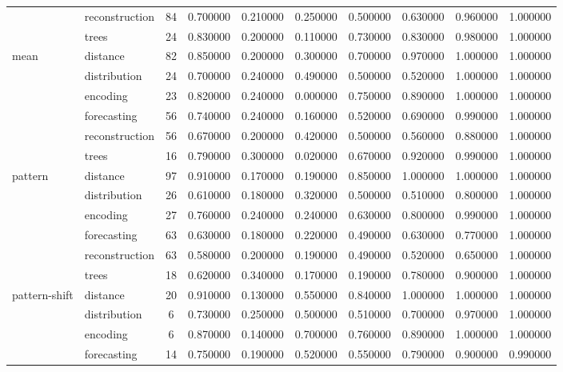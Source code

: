 \begin{tabular}{|l|l|c|c|c|c|c|c|c|c|}
 & reconstruction & 84 & 0.700000 & 0.210000 & 0.250000 & 0.500000 & 0.630000 & 0.960000 & 1.000000 \\
 & trees & 24 & 0.830000 & 0.200000 & 0.110000 & 0.730000 & 0.830000 & 0.980000 & 1.000000 \\
\cline{1-10}
\multirow[t]{6}{*}{mean} & distance & 82 & 0.850000 & 0.200000 & 0.300000 & 0.700000 & 0.970000 & 1.000000 & 1.000000 \\
 & distribution & 24 & 0.700000 & 0.240000 & 0.490000 & 0.500000 & 0.520000 & 1.000000 & 1.000000 \\
 & encoding & 23 & 0.820000 & 0.240000 & 0.000000 & 0.750000 & 0.890000 & 1.000000 & 1.000000 \\
 & forecasting & 56 & 0.740000 & 0.240000 & 0.160000 & 0.520000 & 0.690000 & 0.990000 & 1.000000 \\
 & reconstruction & 56 & 0.670000 & 0.200000 & 0.420000 & 0.500000 & 0.560000 & 0.880000 & 1.000000 \\
 & trees & 16 & 0.790000 & 0.300000 & 0.020000 & 0.670000 & 0.920000 & 0.990000 & 1.000000 \\
\cline{1-10}
\multirow[t]{6}{*}{pattern} & distance & 97 & 0.910000 & 0.170000 & 0.190000 & 0.850000 & 1.000000 & 1.000000 & 1.000000 \\
 & distribution & 26 & 0.610000 & 0.180000 & 0.320000 & 0.500000 & 0.510000 & 0.800000 & 1.000000 \\
 & encoding & 27 & 0.760000 & 0.240000 & 0.240000 & 0.630000 & 0.800000 & 0.990000 & 1.000000 \\
 & forecasting & 63 & 0.630000 & 0.180000 & 0.220000 & 0.490000 & 0.630000 & 0.770000 & 1.000000 \\
 & reconstruction & 63 & 0.580000 & 0.200000 & 0.190000 & 0.490000 & 0.520000 & 0.650000 & 1.000000 \\
 & trees & 18 & 0.620000 & 0.340000 & 0.170000 & 0.190000 & 0.780000 & 0.900000 & 1.000000 \\
\cline{1-10}
\multirow[t]{6}{*}{pattern-shift} & distance & 20 & 0.910000 & 0.130000 & 0.550000 & 0.840000 & 1.000000 & 1.000000 & 1.000000 \\
 & distribution & 6 & 0.730000 & 0.250000 & 0.500000 & 0.510000 & 0.700000 & 0.970000 & 1.000000 \\
 & encoding & 6 & 0.870000 & 0.140000 & 0.700000 & 0.760000 & 0.890000 & 1.000000 & 1.000000 \\
 & forecasting & 14 & 0.750000 & 0.190000 & 0.520000 & 0.550000 & 0.790000 & 0.900000 & 0.990000 \\

\end{tabular}
